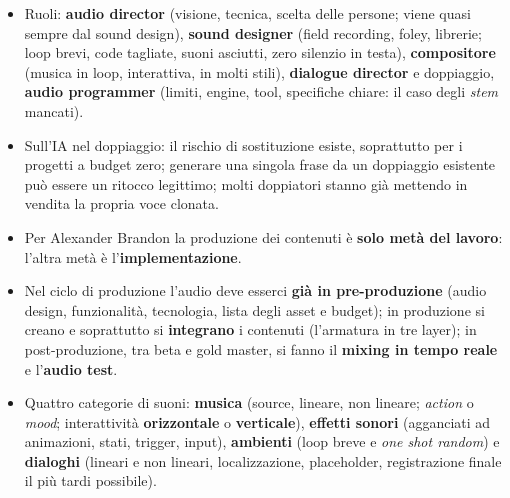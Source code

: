 \begin{itemize}
  \item Ruoli: \textbf{audio director} (visione, tecnica, scelta delle persone;
        viene quasi sempre dal sound design), \textbf{sound designer} (field
        recording, foley, librerie; loop brevi, code tagliate, suoni asciutti,
        zero silenzio in testa), \textbf{compositore} (musica in loop, interattiva,
        in molti stili), \textbf{dialogue director} e doppiaggio,
        \textbf{audio programmer} (limiti, engine, tool, specifiche chiare: il
        caso degli \emph{stem} mancati).
  \item Sull'IA nel doppiaggio: il rischio di sostituzione esiste, soprattutto
        per i progetti a budget zero; generare una singola frase da un doppiaggio
        esistente può essere un ritocco legittimo; molti doppiatori stanno già
        mettendo in vendita la propria voce clonata.
  \item Per Alexander Brandon la produzione dei contenuti è \textbf{solo metà
        del lavoro}: l'altra metà è l'\textbf{implementazione}.
  \item Nel ciclo di produzione l'audio deve esserci \textbf{già in
        pre-produzione} (audio design, funzionalità, tecnologia, lista degli
        asset e budget); in produzione si creano e soprattutto si
        \textbf{integrano} i contenuti (l'armatura in tre layer); in
        post-produzione, tra beta e gold master, si fanno il \textbf{mixing in
        tempo reale} e l'\textbf{audio test}.
  \item Quattro categorie di suoni: \textbf{musica} (source, lineare, non
        lineare; \emph{action} o \emph{mood}; interattività \textbf{orizzontale}
        o \textbf{verticale}), \textbf{effetti sonori} (agganciati ad
        animazioni, stati, trigger, input), \textbf{ambienti} (loop breve e
        \emph{one shot random}) e \textbf{dialoghi} (lineari e non lineari,
        localizzazione, placeholder, registrazione finale il più tardi
        possibile).
\end{itemize}

